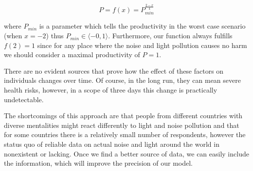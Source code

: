 $$P = f(x) = P_{min}^{\frac{2-x}{4}}$$

\noindent where $P_{min}$ is a parameter which tells the productivity in the worst case scenario  (when $x=-2$) thus $ P_{min}\in \langle -0,1\rangle$. Furthermore, our function always fulfills $f(2) = 1$ since for any place where the noise and light pollution causes no harm we should consider a maximal productivity of $P = 1$.


There are no evident sources that prove how the effect of these factors on individuals changes over time. Of course, in the long run, they can mean severe health risks, however, in a scope of three days this change is practically undetectable.

The shortcomings of this approach are that people from different countries with diverse mentalities might react differently to light and noise pollution and that for some countries there is a relatively small number of respondents, however the status quo of reliable data on actual noise and light around the world in nonexistent or lacking. Once we find a better source of data, we can easily include the information, which will improve the precision of our model.






